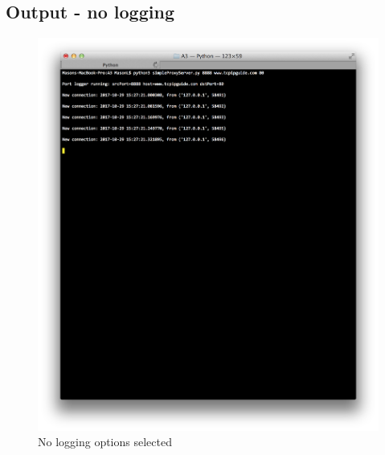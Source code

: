 \documentclass[11pt]{article}
\begin{document}
	\subsection{Output - no logging}
	\begin{figure}[H]
	\includegraphics[scale=0.5, trim={0cm 0cm 0cm 0cm}, clip]{none_output}
	\caption{No logging options selected}
	\end{figure}
	
\end{document}
